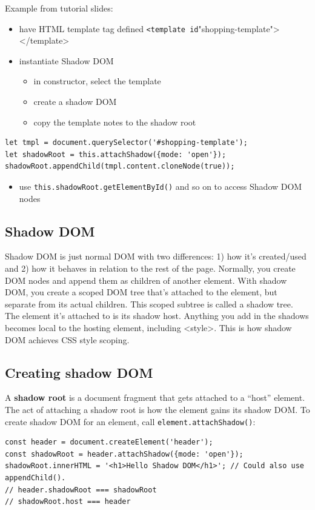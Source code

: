 \documentclass[11pt]{article}
\begin{document}
Example from tutorial slides:
\begin{itemize}
\item have HTML template tag defined \texttt{<template id}"shopping-template"></template>
\item instantiate Shadow DOM
\begin{itemize}
\item in constructor, select the template
\item create a shadow DOM
\item copy the template notes to the shadow root
\end{itemize}
\end{itemize}
\lstset{breaklines=true,language=js,label= ,caption= ,captionpos=b,numbers=none}
\begin{lstlisting}
let tmpl = document.querySelector('#shopping-template');
let shadowRoot = this.attachShadow({mode: 'open'});
shadowRoot.appendChild(tmpl.content.cloneNode(true));
\end{lstlisting}
\begin{itemize}
\item use \texttt{this.shadowRoot.getElementById()} and so on to access Shadow DOM nodes
\end{itemize}
\subsection{Shadow DOM}
\label{sec:org6424cc3}
Shadow DOM is just normal DOM with two differences: 1) how it's created/used and 2) how it behaves in relation to the rest of the page. Normally, you create DOM nodes and append them as children of another element. With shadow DOM, you create a scoped DOM tree that's attached to the element, but separate from its actual children. This scoped subtree is called a shadow tree. The element it's attached to is its shadow host. Anything you add in the shadows becomes local to the hosting element, including <style>. This is how shadow DOM achieves CSS style scoping.
\subsection{Creating shadow DOM}
\label{sec:orgacf0810}
A \textbf{shadow root} is a document fragment that gets attached to a “host” element. The act of attaching a shadow root is how the element gains its shadow DOM. To create shadow DOM for an element, call \texttt{element.attachShadow()}:
\lstset{breaklines=true,language=js,label= ,caption= ,captionpos=b,numbers=none}
\begin{lstlisting}
const header = document.createElement('header');
const shadowRoot = header.attachShadow({mode: 'open'});
shadowRoot.innerHTML = '<h1>Hello Shadow DOM</h1>'; // Could also use appendChild().
// header.shadowRoot === shadowRoot
// shadowRoot.host === header
\end{lstlisting}
\end{document}
